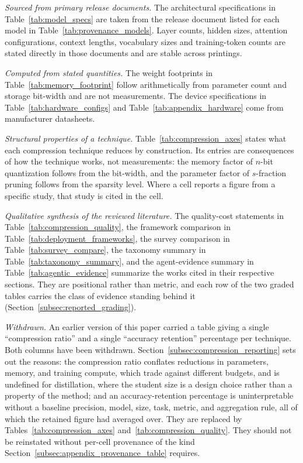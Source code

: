 \emph{Sourced from primary release documents.} The architectural specifications
in Table~\ref{tab:model_specs} are taken from the release document listed for
each model in Table~\ref{tab:provenance_models}. Layer counts, hidden sizes,
attention configurations, context lengths, vocabulary sizes and training-token
counts are stated directly in those documents and are stable across printings.

\emph{Computed from stated quantities.} The weight footprints in
Table~\ref{tab:memory_footprint} follow arithmetically from parameter count and
storage bit-width and are not measurements. The device specifications in
Table~\ref{tab:hardware_configs} and Table~\ref{tab:appendix_hardware} come from
manufacturer datasheets.

\emph{Structural properties of a technique.} Table~\ref{tab:compression_axes}
states what each compression technique reduces by construction. Its entries are
consequences of how the technique works, not measurements: the memory factor of
$n$-bit quantization follows from the bit-width, and the parameter factor of
$s$-fraction pruning follows from the sparsity level. Where a cell reports a
figure from a specific study, that study is cited in the cell.

\emph{Qualitative synthesis of the reviewed literature.} The quality-cost
statements in Table~\ref{tab:compression_quality}, the framework comparison in
Table~\ref{tab:deployment_frameworks}, the survey comparison in
Table~\ref{tab:survey_compare}, the taxonomy summary in
Table~\ref{tab:taxonomy_summary}, and the agent-evidence summary in
Table~\ref{tab:agentic_evidence} summarize the works cited in their respective
sections. They are positional rather than metric, and each row of the two graded
tables carries the class of evidence standing behind it
(Section~\ref{subsec:reported_grading}).

\emph{Withdrawn.} An earlier version of this paper carried a table giving a
single ``compression ratio'' and a single ``accuracy retention'' percentage per
technique. Both columns have been withdrawn.
Section~\ref{subsec:compression_reporting} sets out the reasons: the compression
ratio conflates reductions in parameters, memory, and training compute, which
trade against different budgets, and is undefined for distillation, where the
student size is a design choice rather than a property of the method; and an
accuracy-retention percentage is uninterpretable without a baseline precision,
model, size, task, metric, and aggregation rule, all of which the retained figure
had averaged over. They are replaced by
Tables~\ref{tab:compression_axes} and~\ref{tab:compression_quality}. They should
not be reinstated without per-cell provenance of the kind
Section~\ref{subsec:appendix_provenance_table} requires.

